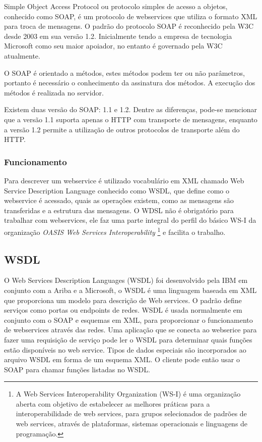 \documentclass{acm_proc_article-sp}
\begin{document}
			Simple Object Access Protocol ou protocolo simples de acesso a objetos, conhecido como SOAP, é um protocolo de webservices que utiliza o formato XML para troca de mensagens. O padrão do protocolo SOAP é reconhecido pela W3C desde 2003 em sua versão 1.2. Inicialmente tendo a empresa de tecnologia Microsoft como seu maior apoiador, no entanto é governado pela W3C atualmente.
		
			O SOAP é orientado a métodos, estes métodos podem ter ou não parâmetros, portanto é necessário o conhecimento da assinatura dos métodos. A execução dos métodos é realizada no servidor.
		
			Existem duas versão do SOAP: 1.1 e 1.2. Dentre as diferenças, pode-se mencionar que a versão 1.1 suporta apenas o HTTP com transporte de mensagens, enquanto a versão 1.2 permite a utilização de outros protocolos de transporte além do HTTP. \cite{WEBSERVICESZEND}
		
		\subsubsection{Funcionamento}
		
			Para descrever um webservice é utilizado vocabulário em XML chamado Web Service Description Language conhecido como WSDL, que define como o webservice é acessado, quais as operações existem, como as mensagens são transferidas e a estrutura das mensagens. O WDSL não é obrigatório para trabalhar com webservices, ele faz uma parte integral do perfil do básico WS-I da organização \emph{OASIS Web Services Interoperability} \footnote{A Web Services Interoperability Organization (WS-I) é uma organização aberta com objetivo de estabelecer as melhores práticas para a interoperabilidade de web services, para grupos selecionados de padrões de web services, através de plataformas, sistemas operacionais e linguagens de programação.\cite{OASIS-WS-I-SITE}} e facilita o trabalho. 
		
		
	\subsection{WSDL}
		
		O Web Services Description Languages (WSDL) foi desenvolvido pela IBM em conjunto com a Ariba e a Microsoft, o WSDL é uma linguagem baseada em XML que proporciona um modelo para descrição de Web services. O padrão define serviços como portas ou endpoints de redes. WSDL é usada normalmente em conjunto com o SOAP e esquemas em XML, para proporcionar o funcionamento de webservices através das redes. Uma aplicação que se conecta ao webserice para fazer uma requisição de serviço pode ler o WSDL para determinar quais funções estão disponíveis no web service. Tipos de dados especiais são incorporados ao arquivo WSDL em forma de um esquema XML. O cliente pode então usar o SOAP para chamar funções listadas no WSDL.
		
\end{document}
